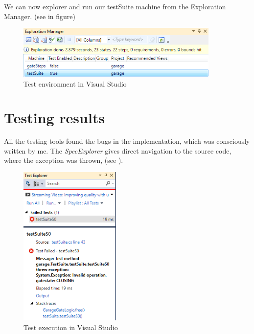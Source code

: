 We can now explorer and run our testSuite machine from the Exploration Manager. (see in  figure)
\begin{figure}[!ht]
	\centering
	\includegraphics[width=100mm, keepaspectratio]{figures/specExplorerRun.png}
	\caption{Test environment in Visual Studio}
	\label{fig:SpecExpRun}
\end{figure}


\section{Testing results}
All the testing tools found the bugs in the implementation, which was consciously written by me. The \textit{SpecExplorer} gives direct navigation to the source code, where the exception was thrown, (see ). 
\begin{figure}[!ht]
	\centering
	\includegraphics[width=50mm, keepaspectratio]{figures/specexplorerTestFailed.png}
	\caption{Test execution in Visual Studio}
	\label{fig:SpecExpRunFailed}
\end{figure}

